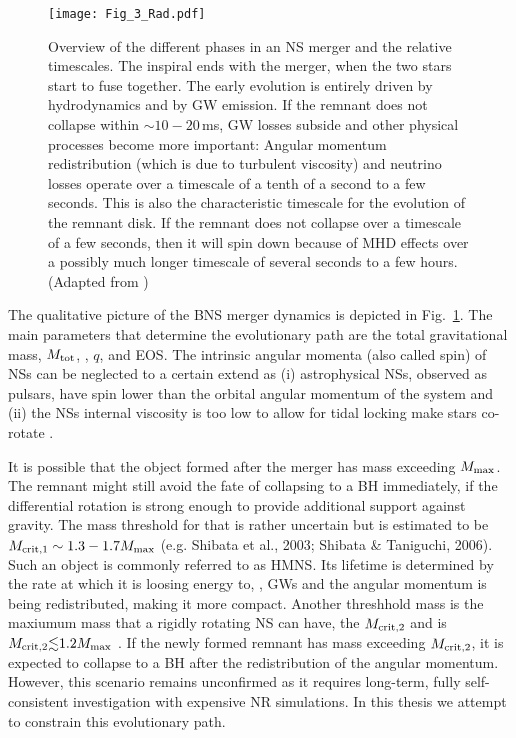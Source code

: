 \begin{figure}[t]
    \centering
    \texttt{[image: Fig\_3\_Rad.pdf]}
    \caption{
        Overview of the different phases in an NS merger and the relative timescales. 
        The inspiral ends with the merger, when the two stars start to fuse together. 
        The early \pmerg{} evolution is entirely driven by hydrodynamics and by \ac{GW} emission. 
        If the remnant does not collapse within ${\sim}10-20\,$ms, \ac{GW} losses
        subside and other physical processes become more important: 
        Angular momentum redistribution (which is due to turbulent viscosity) 
        and neutrino losses operate over a timescale of a tenth of a second to a few
        seconds. This is also the characteristic timescale for the evolution of the remnant disk. 
        If the remnant does not collapse over a timescale of a few seconds, then it will 
        spin down because of \ac{MHD} effects over a possibly much longer timescale 
        of several seconds to a few hours. 
        (Adapted from \citet{Radice:2020ddv})
    }
    \label{fig:intro:pic}
\end{figure}

The qualitative picture of the \ac{BNS} merger dynamics is depicted in Fig.~\ref{fig:intro:pic}. 
The main parameters that determine the evolutionary path are the total gravitational mass, 
$M_{\rm tot}$, \mr, $q$, and \ac{EOS}. The intrinsic angular momenta (also called spin) of \acp{NS} 
can be neglected to a certain extend as (i) astrophysical \acp{NS}, observed as pulsars, have 
spin lower than the orbital angular momentum of the system and (ii) the \acp{NS} internal 
viscosity is too low to allow for tidal locking make stars co-rotate \cite{(e.g. Bildsten & Cutler, 1992)}.

It is possible that the object formed after the merger has mass exceeding $M_{\rm max}$. 
The remnant might still avoid the fate of collapsing to a \ac{BH} immediately, if the differential 
rotation is strong enough to provide additional support against gravity. The mass threshold 
for that is rather uncertain but is estimated to be $M_{\rm crit,1}\sim1.3-1.7M_{\rm max}$ 
(e.g. Shibata et al., 2003; Shibata & Taniguchi, 2006). Such an object is commonly referred to as 
\ac{HMNS}. Its lifetime is determined by the rate at which it is loosing energy to, \eg, \acp{GW}
and the angular momentum is being redistributed, making it more compact. 
Another threshhold mass is the maxiumum mass that a rigidly rotating \ac{NS} can have, the 
$M_{\rm crit,2}$ and is $M_{\rm crit,2}{\lesssim}1.2M_{\rm max}$ \cite{Cook et al., 1994}. 
If the newly formed remnant has mass exceeding $M_{\rm crit,2}$, it is expected to collapse to 
a \ac{BH} after the redistribution of the angular momentum. However, this scenario remains 
unconfirmed as it requires long-term, fully self-consistent investigation with expensive 
\ac{NR} simulations. In this thesis we attempt to constrain this evolutionary path.



